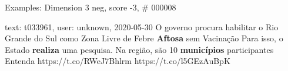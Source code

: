 \begin{frame}{Examples: Dimension 3 neg, score -3, \# 000008}
\footnotesize
\begin{alertblock}{text: t033961, user: unknown, 2020-05-30}
O governo procura habilitar o Rio Grande do Sul como Zona Livre de Febre 
\textbf{Aftosa} sem Vacinação  Para isso, 
o Estado \textbf{realiza} uma pesquisa. Na região, são 10 \textbf{municípios} 
participantes Entenda https://t.co/RWeJ7Bhlrm https://t.co/l5GEzAuBpK 
\end{alertblock}
\end{frame}
